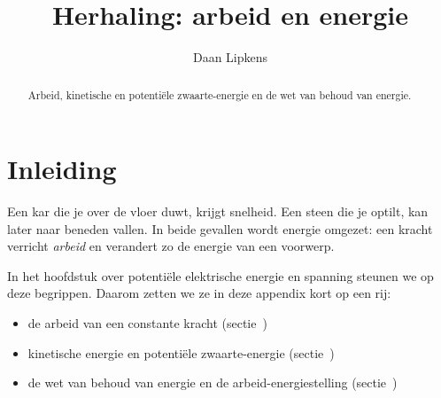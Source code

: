 \documentclass{ximera}
\title{Herhaling: arbeid en energie}
\author{Daan Lipkens}
\begin{document}
\begin{abstract}
    Arbeid, kinetische en potentiële zwaarte-energie en de wet van behoud van energie.
\end{abstract}
\maketitle
\label{hoofdstuk:energie}

\section*{Inleiding}
Een kar die je over de vloer duwt, krijgt snelheid. Een steen die je optilt, kan later naar beneden vallen. In beide gevallen wordt energie omgezet: een kracht verricht \emph{arbeid} en verandert zo de energie van een voorwerp.

In het hoofdstuk over potentiële elektrische energie en spanning steunen we op deze begrippen. Daarom zetten we ze in deze appendix kort op een rij:
\begin{itemize}
    \item de arbeid van een constante kracht (sectie~)
    \item kinetische energie en potentiële zwaarte-energie (sectie~)
    \item de wet van behoud van energie en de arbeid-energiestelling (sectie~)
\end{itemize}
\end{document}
